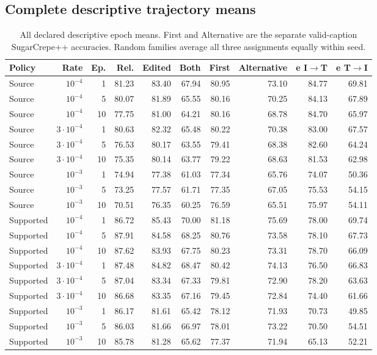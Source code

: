 \subsection{Complete descriptive trajectory means}
\begin{table}[t]
\nolinenumbers
\centering
\small
\setlength{\tabcolsep}{3pt}
\begin{tabular}{lrrrrrrrrr}
\toprule
Policy & Rate & Ep. & Rel. & Edited & Both & First & Alternative & e I$\to$T & e T$\to$I\\
\midrule
Source & $10^{-4}$ & 1 & 81.23 & 83.40 & 67.94 & 80.95 & 73.10 & 84.77 & 69.81\\
Source & $10^{-4}$ & 5 & 80.07 & 81.89 & 65.55 & 80.16 & 70.25 & 84.13 & 67.89\\
Source & $10^{-4}$ & 10 & 77.75 & 81.00 & 64.21 & 80.16 & 68.78 & 84.70 & 65.97\\
Source & $3\cdot10^{-4}$ & 1 & 80.63 & 82.32 & 65.48 & 80.22 & 70.38 & 83.00 & 67.57\\
Source & $3\cdot10^{-4}$ & 5 & 76.53 & 80.17 & 63.55 & 79.41 & 68.38 & 82.60 & 64.24\\
Source & $3\cdot10^{-4}$ & 10 & 75.35 & 80.14 & 63.77 & 79.22 & 68.63 & 81.53 & 62.98\\
Source & $10^{-3}$ & 1 & 74.94 & 77.38 & 61.03 & 77.34 & 65.76 & 74.07 & 50.36\\
Source & $10^{-3}$ & 5 & 73.25 & 77.57 & 61.71 & 77.35 & 67.05 & 75.53 & 54.15\\
Source & $10^{-3}$ & 10 & 70.51 & 76.35 & 60.25 & 76.59 & 65.51 & 75.97 & 54.11\\
Supported & $10^{-4}$ & 1 & 86.72 & 85.43 & 70.00 & 81.18 & 75.69 & 78.00 & 69.74\\
Supported & $10^{-4}$ & 5 & 87.91 & 84.58 & 68.25 & 80.76 & 73.58 & 78.10 & 67.73\\
Supported & $10^{-4}$ & 10 & 87.62 & 83.93 & 67.75 & 80.23 & 73.31 & 78.70 & 66.09\\
Supported & $3\cdot10^{-4}$ & 1 & 87.48 & 84.82 & 68.47 & 80.42 & 74.13 & 76.50 & 66.83\\
Supported & $3\cdot10^{-4}$ & 5 & 87.04 & 83.34 & 67.33 & 79.81 & 72.90 & 78.20 & 63.63\\
Supported & $3\cdot10^{-4}$ & 10 & 86.68 & 83.35 & 67.16 & 79.45 & 72.84 & 74.40 & 61.66\\
Supported & $10^{-3}$ & 1 & 86.17 & 81.61 & 65.42 & 78.12 & 71.93 & 70.73 & 49.85\\
Supported & $10^{-3}$ & 5 & 86.03 & 81.66 & 66.97 & 78.01 & 73.22 & 70.50 & 54.51\\
Supported & $10^{-3}$ & 10 & 85.78 & 81.28 & 65.62 & 77.37 & 71.94 & 65.13 & 52.21\\
\bottomrule
\end{tabular}
\caption{All declared descriptive epoch means. First and Alternative are the separate valid-caption SugarCrepe++ accuracies. Random families average all three assignments equally within seed.}\label{tab:futraj0}
\end{table}
